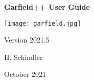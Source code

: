 \begin{titlepage}
  {
  \centering
  \sffamily
  \linespread{1.5}

  \vspace{3cm} 

  \huge{\textbf{Garfield++ User Guide}}

  \vspace{2cm}

  \texttt{[image: garfield.jpg]}

  \vspace{2cm}

  \large
  Version 2021.5

  \vspace{2cm}
  \large
  H. Schindler

  \vfill

  October 2021

  }
\end{titlepage}
